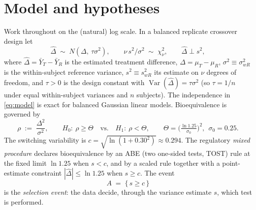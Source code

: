 \documentclass[11pt]{article}
\theoremstyle{remark}
\newcommand{\Dhat}{\hat{\Delta}}
\newcommand{\swR}{s^2}
\DeclareMathOperator{\Var}{Var}
\begin{document}
\section{Model and hypotheses}\label{sec:model}

Work throughout on the (natural) log scale. In a balanced replicate crossover design let
\begin{equation}
\Dhat \;\sim\; N(\Delta,\ \tau\sigma^2), \qquad \nu\, \swR/\sigma^2 \;\sim\; \chi^2_\nu, \qquad \Dhat \perp \swR ,
\label{eq:model}
\end{equation}
where $\Dhat=\bar Y_T-\bar Y_R$ is the estimated treatment difference, $\Delta=\mu_T-\mu_R$, $\sigma^2\equiv\sigma^2_{wR}$ is the within-subject reference variance, $s^2\equiv s^2_{wR}$ its estimate on $\nu$ degrees of freedom, and $\tau>0$ is the design constant with $\Var(\Dhat)=\tau\sigma^2$ (so $\tau=1/n$ under equal within-subject variances and $n$ subjects). The independence in \eqref{eq:model} is exact for balanced Gaussian linear models. Bioequivalence is governed by
\begin{equation}
\rho \;:=\; \frac{\Delta^2}{\sigma^2}, \qquad H_0:\ \rho \ge \Theta \quad\text{vs.}\quad H_1:\ \rho < \Theta, \qquad
\Theta = \Big(\tfrac{\ln 1.25}{\sigma_0}\Big)^2,\ \ \sigma_0=0.25 .
\label{eq:hyp}
\end{equation}
The switching variability is $c=\sqrt{\ln(1+0.30^2)}\approx 0.294$. The regulatory \emph{mixed procedure} declares bioequivalence by an ABE (two one-sided tests, TOST) rule at the fixed limit $\ln 1.25$ when $s< c$, and by a scaled rule together with a point-estimate constraint $|\Dhat|\le\ln1.25$ when $s\ge c$. The event
\begin{equation}
A \;=\; \{\, s \ge c \,\}
\end{equation}
is the \emph{selection event}: the data decide, through the variance estimate $s$, which test is performed.
\end{document}
